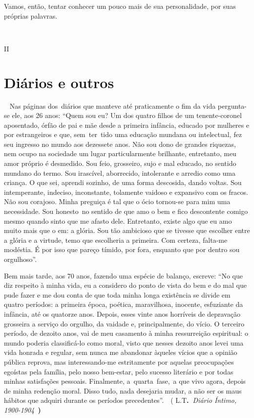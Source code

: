 Vamos, então, tentar conhecer um pouco mais de sua personalidade, por
suas próprias palavras.

~

II

\section{Diários e outros}

~ Nas páginas dos~diários que manteve até praticamente o fim da vida
pergunta-se ele, aos 26 anos: ``Quem sou eu? Um dos quatro filhos de um
tenente-coronel aposentado, órfão de pai e mãe desde a primeira
infância, educado por mulheres e por estrangeiros e que, sem~ter~tido
uma educação mundana ou intelectual, fez seu ingresso no mundo aos
dezessete anos. Não sou dono de grandes riquezas, nem ocupo na sociedade
um lugar particularmente brilhante, entretanto, meu amor próprio é
desmedido. Sou feio, grosseiro, sujo e mal educado, no sentido mundano
do termo. Sou irascível, aborrecido, intolerante e arredio como uma
criança. O que sei, aprendi sozinho, de uma forma descosida, dando
voltas. Sou intemperante, indeciso, inconstante, tolamente vaidoso e
expansivo com os fracos. Não sou corajoso. Minha preguiça é tal que o
ócio tornou-se para mim uma necessidade. Sou honesto~no sentido de que
amo o bem e fico descontente comigo mesmo quando sinto que me afasto
dele. Entretanto, existe algo que eu amo muito mais que o em: a glória.
Sou tão ambicioso que se tivesse que escolher entre a glória e a
virtude, temo que escolheria a primeira. Com certeza, falta-me modéstia.
É por isso que pareço tímido, por fora, enquanto que por dentro sou
orgulhoso''.

Bem mais tarde, aos 70 anos, fazendo uma espécie de balanço, escreve:
``No que diz respeito à minha vida, eu a considero do ponto de vista do
bem e do mal que pude fazer e me dou conta de que toda minha longa
existência se divide em quatro períodos: a primeira época, poética,
maravilhosa, inocente, esfuziante da infância, até os quatorze anos.
Depois, esses vinte anos horríveis de depravação grosseira a serviço do
orgulho, da vaidade e, principalmente, do vício. O terceiro período, de
dezoito anos, vai de meu casamento à minha ressurreição espiritual: o
mundo poderia classificá-lo como moral, visto que nesses dezoito anos
levei uma vida honrada e regular, sem nunca me abandonar àqueles vícios
que a opinião pública reprova, mas interessando-me estritamente por
aquelas preocupações egoístas pela família, pelo nosso bem-estar, pelo
sucesso literário e por todas minhas satisfações pessoais. Finalmente,
a~quarta~fase,~a que vivo agora, depois de minha redenção moral. Disso
tudo, nada desejaria mudar, a não ser os maus hábitos que adquiri
durante os períodos precedentes''.~~( L.T\textbf{.~}\emph{Diário Íntimo,
1900-1904~}\textbf{)}

